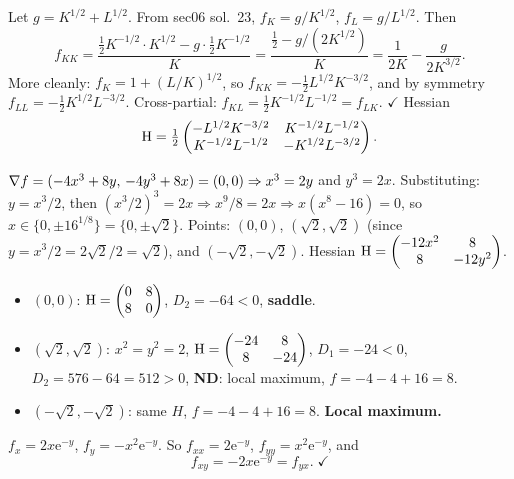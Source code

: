 \begin{solutions}
  \item Let $g=K^{1/2}+L^{1/2}$. From sec06 sol.\ 23, $f_K = g/K^{1/2}$,
        $f_L = g/L^{1/2}$. Then
        \[
          f_{KK} = \frac{\tfrac12K^{-1/2}\cdot K^{1/2}-g\cdot\tfrac12K^{-1/2}}{K}
                  = \frac{\tfrac12-g/(2K^{1/2})}{K}
                  = \frac{1}{2K}-\frac{g}{2K^{3/2}} .
        \]
        More cleanly: $f_K = 1+(L/K)^{1/2}$, so
        $f_{KK} = -\tfrac12L^{1/2}K^{-3/2}$, and by symmetry
        $f_{LL} = -\tfrac12K^{1/2}L^{-3/2}$. Cross-partial:
        $f_{KL} = \tfrac12K^{-1/2}L^{-1/2} = f_{LK}$. \; $\checkmark$
        Hessian
        \[
          \operatorname{H} = \tfrac12
          \begin{pmatrix}
            -L^{1/2}K^{-3/2} & K^{-1/2}L^{-1/2} \\
            K^{-1/2}L^{-1/2} & -K^{1/2}L^{-3/2}
          \end{pmatrix} .
        \]

  \item $\nabla f = (-4x^{3}+8y,\,-4y^{3}+8x) = (0,0) \Rightarrow x^{3}=2y$
        and $y^{3}=2x$. Substituting: $y=x^{3}/2$, then
        $(x^{3}/2)^{3}=2x \Rightarrow x^{9}/8=2x \Rightarrow x(x^{8}-16)=0$,
        so $x\in\{0,\pm16^{1/8}\}=\{0,\pm\sqrt2\}$. Points: $(0,0)$,
        $(\sqrt2,\sqrt2)$ (since $y=x^{3}/2=2\sqrt2/2=\sqrt2$), and
        $(-\sqrt2,-\sqrt2)$. Hessian
        $\operatorname{H} = \begin{pmatrix}-12x^{2}&8\\8&-12y^{2}\end{pmatrix}$.
        \begin{itemize}
          \item $(0,0)$: $\operatorname{H} = \begin{pmatrix}0&8\\8&0\end{pmatrix}$,
                $D_2=-64<0$, \textbf{saddle}.
          \item $(\sqrt2,\sqrt2)$: $x^{2}=y^{2}=2$,
                $\operatorname{H} = \begin{pmatrix}-24&8\\8&-24\end{pmatrix}$,
                $D_1=-24<0$, $D_2=576-64=512>0$, \textbf{ND}: local
                maximum, $f=-4-4+16=8$.
          \item $(-\sqrt2,-\sqrt2)$: same $H$, $f=-4-4+16=8$. \textbf{Local
                maximum.}
        \end{itemize}

  \item $f_x = 2x\mathrm{e}^{-y}$, $f_y = -x^{2}\mathrm{e}^{-y}$. So
        $f_{xx} = 2\mathrm{e}^{-y}$, $f_{yy} = x^{2}\mathrm{e}^{-y}$, and
        \[
          f_{xy} = -2x\mathrm{e}^{-y} = f_{yx} . \; \checkmark
        \]


\end{solutions}
